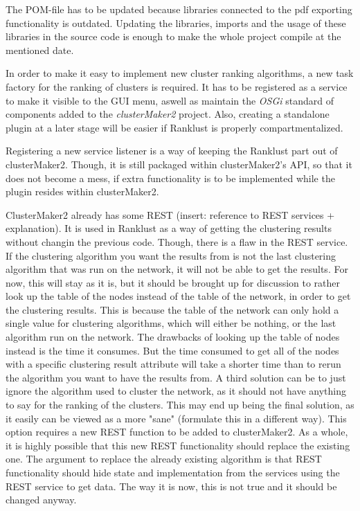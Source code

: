 \documentclass[UKenglish]{ifimaster}
\begin{document}
The POM-file has to be updated because libraries connected to the pdf exporting functionality is outdated. Updating the
libraries, imports and the usage of these libraries in the source code is enough to make the whole project compile at
the mentioned date.

In order to make it easy to implement new cluster ranking algorithms, a new task factory for the ranking of clusters is
required. It has to be registered as a service to make it visible to the GUI menu, aswell as maintain the \textit{OSGi}
standard of components added to the \textit{clusterMaker2} project. Also, creating a standalone plugin at a later stage will
be easier if Ranklust is properly compartmentalized.

Registering a new service listener is a way of keeping the Ranklust part out of clusterMaker2. Though, it is still
packaged within clusterMaker2's API, so that it does not become a mess, if extra functionality is to be implemented
while the plugin resides within clusterMaker2.

ClusterMaker2 already has some REST (insert: reference to REST services + explanation). It is used in Ranklust as a way
of getting the clustering results without changin the previous code. Though, there is a flaw in the REST service. If the
clustering algorithm you want the results from is not the last clustering algorithm that was run on the network, it will
not be able to get the results. For now, this will stay as it is, but it should be brought up for discussion to rather
look up the table of the nodes instead of the table of the network, in order to get the clustering results. This is
because the table of the network can only hold a single value for clustering algorithms, which will either be nothing,
or the last algorithm run on the network. The drawbacks of looking up the table of nodes instead is the time it
consumes. But the time consumed to get all of the nodes with a specific clustering result attribute will take a shorter
time than to rerun the algorithm you want to have the results from. A third solution can be to just ignore the algorithm
used to cluster the network, as it should not have anything to say for the ranking of the clusters. This may end up
being the final solution, as it easily can be viewed as a more "sane" (formulate this in a different way). This option
requires a new REST function to be added to clusterMaker2. As a whole, it is highly possible that this new REST
functionality should replace the existing one. The argument to replace the already existing algorithm is that REST
functionality should hide state and implementation from the services using the REST service to get data. The way it is
now, this is not true and it should be changed anyway.
\end{document}
